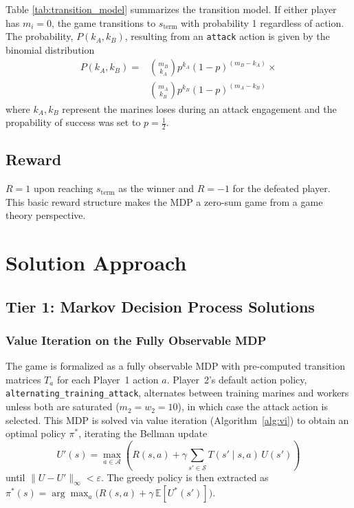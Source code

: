 \documentclass[conference]{IEEEtran}
\begin{document}
Table \ref{tab:transition_model} summarizes the transition model. If either player has $m_i = 0$, the
game transitions to $s_{\text{term}}$ with probability 1 regardless of action. The probability, $P(k_A,k_B)$, resulting from an \texttt{attack} action is given by the binomial distribution
\begin{align}
  P(k_A, k_B) = &\binom{m_B}{k_A} p^{k_A}(1-p)^{(m_B - k_A)} \times \\
                &\binom{m_A}{k_B} p^{k_B}(1-p)^{(m_A - k_B)}
\end{align}
\noindent
where $k_A,k_B$ represent the marines loses during an attack engagement and the propability of success was set to $p=\frac{1}{2}$.


\subsection{Reward}

$R = 1$ upon reaching $s_{\text{term}}$ as the winner and $R = -1$ for the defeated player. This basic reward structure makes the MDP a zero-sum game from a game theory perspective.

\section{Solution Approach}

\subsection{Tier 1: Markov Decision Process Solutions}

\subsubsection{Value Iteration on the Fully Observable MDP}
The game is formalized as a fully observable MDP with pre-computed transition matrices
$T_a$ for each Player~1 action $a$. Player~2's default action policy,
\texttt{alternating\_training\_attack}, alternates between training marines and workers
unless both are saturated ($m_2 = w_2 = 10$), in which case the attack action is
selected. This MDP is solved via value iteration (Algorithm~\ref{alg:vi}) to obtain an
optimal policy $\pi^*$, iterating the Bellman update
\begin{equation}
  U'(s) = \max_{a \in \mathcal{A}} \left( R(s,a) + \gamma \sum_{s' \in \mathcal{S}}
  T(s' \mid s, a)\, U(s') \right)
\end{equation}
until $\|U - U'\|_{\infty} < \varepsilon$.  The greedy policy is then extracted as
$\pi^*(s) = \arg\max_a \bigl(R(s,a)+\gamma\,\mathbb{E}[U^*(s')]\bigr)$.
\end{document}
